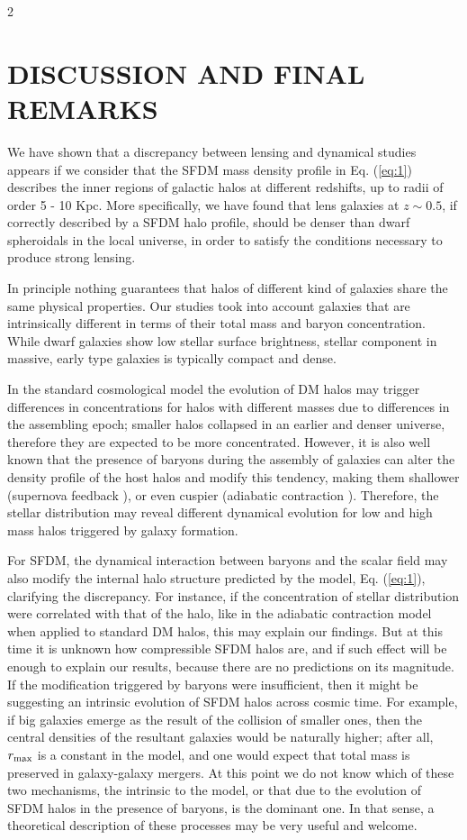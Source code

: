 \documentclass {article}
\begin{document}
\begin{multicols} {2}
\section {\normalsize {DISCUSSION AND FINAL REMARKS}}


We have shown that a discrepancy between lensing and dynamical studies appears if we consider that the SFDM mass density profile in Eq. (\ref{eq:1}) describes the inner regions
of galactic halos at different redshifts, up to radii of order 5 - 10 Kpc. More specifically, we have found that lens galaxies at $z \sim 0.5$, if correctly described by a SFDM halo profile, should be denser than dwarf spheroidals in the local universe, in order to satisfy the conditions necessary to produce strong lensing.


In principle nothing guarantees that halos of different kind of galaxies share the same physical properties. Our studies took into account galaxies that are intrinsically different in terms of their total mass and baryon concentration. While dwarf galaxies show low stellar surface brightness, stellar component in massive, early type galaxies is typically compact and dense.


In the standard cosmological model the evolution of DM halos may trigger differences in concentrations for halos with different masses due to differences in the assembling epoch; smaller halos collapsed in an earlier and denser universe, therefore they are expected to be more concentrated. However, it is also well known that the presence of baryons during the assembly of galaxies can alter the density profile of the host halos and modify this tendency, making them shallower (supernova feedback \cite{Ceverino_2009}), or even cuspier (adiabatic contraction \cite{blumenthal1986contraction}). Therefore, the stellar distribution may reveal different dynamical evolution for low and high mass halos triggered by galaxy formation.


For SFDM, the dynamical interaction between baryons and the scalar field may also modify the internal halo structure predicted by the model, Eq. (\ref{eq:1}), clarifying the
discrepancy. For instance, if the concentration of stellar distribution were correlated with that of the halo, like in the adiabatic contraction model when applied to standard DM halos, this may explain our findings. But at this time it is unknown how compressible SFDM halos are, and if such effect will be enough to explain our results, because there are no predictions on its magnitude. If the modification triggered by baryons were insufficient, then it might be suggesting an intrinsic evolution of SFDM halos across cosmic time. For example, if big galaxies emerge as the result of the collision of smaller ones, then the central densities of the resultant galaxies would be naturally higher; after all, $r_{\textup{max}}$ is a constant in the model, and one would expect that total mass is
preserved in galaxy-galaxy mergers. At this point we do not know which of these two mechanisms, the intrinsic to the model, or that due to the evolution of SFDM halos in the presence of baryons, is the dominant one. In that sense, a theoretical description of these processes may be very useful and welcome.



\end{multicols}
\end{document}
